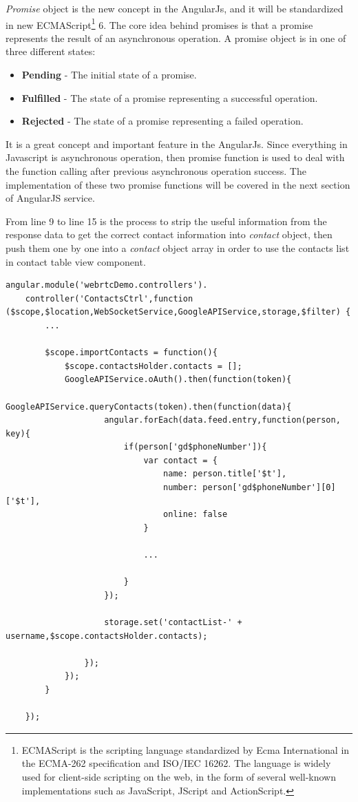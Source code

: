 \par \textit{Promise} object is the new concept in the AngularJs, and it will be standardized in new ECMAScript\footnote{ECMAScript is the scripting language standardized by Ecma International in the ECMA-262 specification and ISO/IEC 16262. The language is widely used for client-side scripting on the web, in the form of several well-known implementations such as JavaScript, JScript and ActionScript.\cite{wiki:ecmascript}} 6. The core idea behind promises is that a promise represents the result of an asynchronous operation. A promise object is in one of three different states:\cite{website:promise}
\begin{itemize}[topsep=-1em,parsep=0em,itemsep=0em]
 \item \textbf{Pending} - The initial state of a promise.
 \item \textbf{Fulfilled} - The state of a promise representing a successful operation.
 \item \textbf{Rejected} - The state of a promise representing a failed operation.
\end{itemize}

\par It is a great concept and important feature in the AngularJs. Since everything in Javascript is asynchronous operation, then promise function is used to deal with the function calling after previous asynchronous operation success. The implementation of these two promise functions will be covered in the next section of AngularJS service.

\par From line 9 to line 15 is the process to strip the useful information from the response data to get the correct contact information into \textit{contact} object, then push them one by one into a \textit{contact} object array in order to use the contacts list in contact table view component.

\begin{lstlisting}[caption={ContactsCtrl.js in application client},label={code:contact_ctrl}]
angular.module('webrtcDemo.controllers').
	controller('ContactsCtrl',function ($scope,$location,WebSocketService,GoogleAPIService,storage,$filter) {
		...
		
		$scope.importContacts = function(){
			$scope.contactsHolder.contacts = [];
			GoogleAPIService.oAuth().then(function(token){
				GoogleAPIService.queryContacts(token).then(function(data){
					angular.forEach(data.feed.entry,function(person, key){
						if(person['gd$phoneNumber']){
							var contact = {
								name: person.title['$t'],
								number: person['gd$phoneNumber'][0]['$t'],
								online: false
							}

							...

						}
					});

					storage.set('contactList-' + username,$scope.contactsHolder.contacts);

				});
			});
		}

	});
\end{lstlisting}


